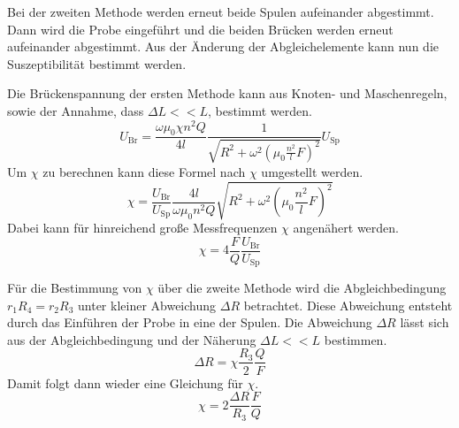 Bei der zweiten Methode werden erneut beide Spulen aufeinander abgestimmt. Dann wird die Probe eingeführt und die beiden Brücken werden erneut aufeinander abgestimmt. Aus der
Änderung der Abgleichelemente kann nun die Suszeptibilität bestimmt werden.

Die Brückenspannung der ersten Methode kann aus Knoten- und Maschenregeln, sowie der Annahme, dass $\Delta L << L$, bestimmt werden. 
\begin{equation*}
    U_{\text{Br}} = \frac{\omega\mu_0\chi n^2Q}{4l}\frac{1}{\sqrt{R^2 + \omega^2\left(\mu_0\frac{n^2}{l}F\right)^2}}U_{\text{Sp}}
\end{equation*}
Um $\chi$ zu berechnen kann diese Formel nach $\chi$ umgestellt werden.
\begin{equation}
    \label{eqn:chi_theo}
    \chi = \frac{U_{\text{Br}}}{U_{\text{Sp}}}\frac{4l}{\omega\mu_0n^2Q}\sqrt{R^2 + \omega^2\left(\mu_0\frac{n^2}{l}F\right)^2}
\end{equation}
Dabei kann für hinreichend große Messfrequenzen $\chi$ angenähert werden.
\begin{equation}
    \label{eqn:chi:näherung}
    \chi = 4 \frac{F}{Q}\frac{U_{\text{Br}}}{U_{\text{Sp}}}
\end{equation}


Für die Bestimmung von $\chi$ über die zweite Methode wird die Abgleichbedingung $r_1R_4 = r_2R_3$ unter kleiner Abweichung $\Delta R$ betrachtet. Diese Abweichung entsteht
durch das Einführen der Probe in eine der Spulen. Die Abweichung $\Delta R$ lässt sich aus der Abgleichbedingung und der Näherung $\Delta L << L$ bestimmen.
\begin{equation*}
    \Delta R = \chi\frac{R_3}{2}\frac{Q}{F}
\end{equation*}
Damit folgt dann wieder eine Gleichung für $\chi$.
\begin{equation}
    \label{eqn:chimethode2}
    \chi = 2\frac{\Delta R}{R_3}\frac{F}{Q}
\end{equation}

